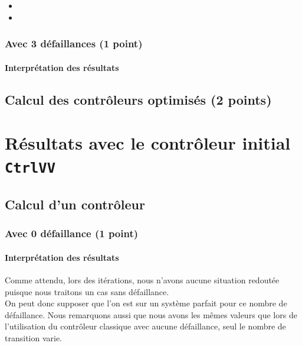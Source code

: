 \documentclass[a4paper]{book}
\begin{document}
\begin{itemize}
	\item 
	\item 
\end{itemize}

\subsubsection{Avec 3 défaillances (1 point)}





\paragraph{Interprétation des résultats}



\subsection{Calcul des contrôleurs optimisés (2 points)}

\section{Résultats avec le contrôleur initial {\tt CtrlVV}}

\subsection{Calcul d'un contrôleur}

\subsubsection{Avec 0 défaillance (1 point)}





\paragraph{Interprétation des résultats}

Comme attendu, lors des itérations, nous n'avons aucune situation redoutée puisque nous traitons un cas sans défaillance. \\ 
On peut donc supposer que l'on est sur un système parfait pour ce nombre de défaillance. Nous remarquons aussi que nous avons les mêmes valeurs que lors de l'utilisation du contrôleur classique avec aucune défaillance, seul le nombre de transition varie.
\end{document}
